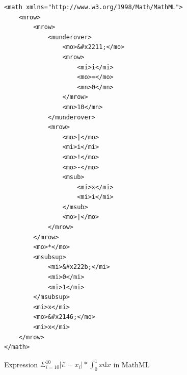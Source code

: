 \documentclass[11pt,oneside,final]{fithesis2}
\begin{document}
\begin{figure}[!ht]
\lstset{language=XML,frame=lines}
\begin{lstlisting}
<math xmlns="http://www.w3.org/1998/Math/MathML">
	<mrow>
		<mrow>
			<munderover>
				<mo>&#x2211;</mo>
				<mrow>
					<mi>i</mi>
					<mo>=</mo>
					<mn>0</mn>
				</mrow>
				<mn>10</mn>
			</munderover>
			<mrow>
				<mo>|</mo>
				<mi>i</mi>
				<mo>!</mo>
				<mo>-</mo>
				<msub>
					<mi>x</mi>
					<mi>i</mi>
				</msub>
				<mo>|</mo>
			</mrow>
		</mrow>
		<mo>*</mo>
		<msubsup>
			<mi>&#x222b;</mi>
			<mi>0</mi>
			<mi>1</mi>
		</msubsup>
		<mi>x</mi>
		<mo>&#x2146;</mo>
		<mi>x</mi>
	</mrow>
</math>
\end{lstlisting}
\caption{Expression $\Sigma_{i=10}^{10}|i!-x_i|*\int_0^1 x \mathrm{d} x$ in MathML}
\label{appendix:xml:example2}
\end{figure}
\end{document}

